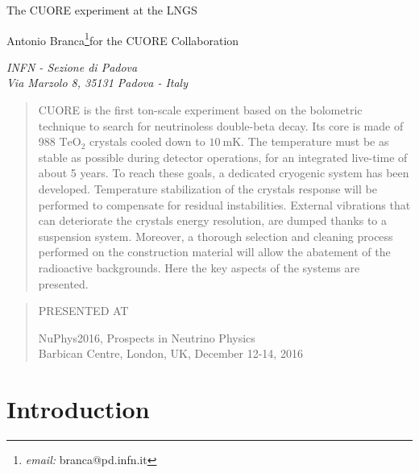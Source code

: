 \documentclass[12pt]{article}
\makeatletter
\newcommand\pubnumber{NuPhys2016-Branca}
\newcommand\pubdate{\today}
\def\padova{INFN - Sezione di Padova\\
Via Marzolo 8, 35131 Padova - Italy}
\def\email{\footnote{\emph{email:} branca@pd.infn.it}}
\def\Title#1{\begin{center} {\Large #1 } \end{center}}
\def\Author#1{\begin{center}{ \sc #1} \end{center}}
\def\Address#1{\begin{center}{ \it #1} \end{center}}
\newcommand\pubblock{\rightline{\begin{tabular}{l} \pubnumber\\
         \pubdate  \end{tabular}}}
\newenvironment{Abstract}{\begin{quotation}  }{\end{quotation}}
\newenvironment{Presented}{\begin{quotation} \begin{center} 
             PRESENTED AT\end{center}\bigskip 
      \begin{center}\begin{large}}{\end{large}\end{center} \end{quotation}}
\makeatother
\begin{document}
\begin{titlepage}
\pubblock

\vfill
\Title{The CUORE experiment at the LNGS}
\vfill
\Author{Antonio Branca\email  for the CUORE Collaboration}
\Address{\padova}
\vfill
\begin{Abstract}
CUORE is the first ton-scale experiment based on the bolometric technique to search for neutrinoless double-beta decay. Its core is made of 988 $\mathrm{TeO_{2}}$ crystals cooled down to $10~\mathrm{mK}$. The temperature must be as stable as possible during detector operations, for an integrated live-time of about 5 years. To reach these goals, a dedicated cryogenic system has been developed. Temperature stabilization of the crystals response will be performed to compensate for residual instabilities. External vibrations that can deteriorate the crystals energy resolution, are dumped thanks to a suspension system. Moreover, a thorough selection and cleaning process performed on the construction material will allow the abatement of the radioactive backgrounds. Here the key aspects of the systems are presented.
\end{Abstract}
\vfill
\begin{Presented}
NuPhys2016, Prospects in Neutrino Physics\\
Barbican Centre, London, UK,  December 12-14, 2016
\end{Presented}
\vfill
\end{titlepage}
\def\thefootnote{\fnsymbol{footnote}}
\setcounter{footnote}{0}
%

\section{Introduction}
\end{document}

